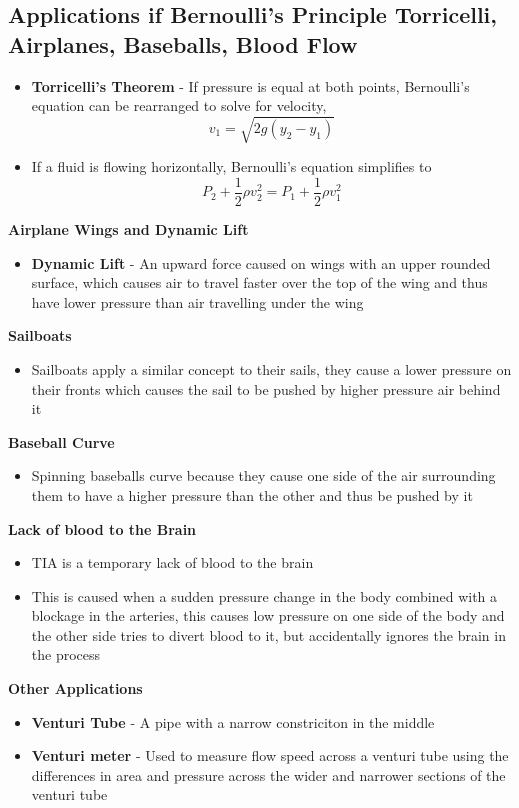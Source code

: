 \subsection{Applications if Bernoulli’s Principle Torricelli, Airplanes, Baseballs, Blood Flow}
\begin{itemize}
    \item \textbf{Torricelli's Theorem} - If pressure is equal at both points, Bernoulli's equation can be rearranged to solve for velocity, \[v_1=\sqrt{2g(y_2-y_1)}\]
    \item If a fluid is flowing horizontally, Bernoulli's equation simplifies to \[P_2+\frac{1}{2}\rho v^2_2=P_1+\frac{1}{2}\rho v^2_1\]
\end{itemize}

\textbf{Airplane Wings and Dynamic Lift}
\begin{itemize}
    \item \textbf{Dynamic Lift} - An upward force caused on wings with an upper rounded surface, which causes air to travel faster over the top of the wing and thus have lower pressure than air travelling under the wing
\end{itemize}

\textbf{Sailboats}
\begin{itemize}
    \item Sailboats apply a similar concept to their sails, they cause a lower pressure on their fronts which causes the sail to be pushed by higher pressure air behind it
\end{itemize}

\textbf{Baseball Curve}
\begin{itemize}
    \item Spinning baseballs curve because they cause one side of the air surrounding them to have a higher pressure than the other and thus be pushed by it
\end{itemize}

\textbf{Lack of blood to the Brain}
\begin{itemize}
    \item TIA is a temporary lack of blood to the brain
    \item This is caused when a sudden pressure change in the body combined with a blockage in the arteries, this causes low pressure on one side of the body and the other side tries to divert blood to it, but accidentally ignores the brain in the process
\end{itemize}

\textbf{Other Applications}
\begin{itemize}
    \item \textbf{Venturi Tube} - A pipe with a narrow constriciton in the middle
    \item \textbf{Venturi meter} - Used to measure flow speed across a venturi tube using the differences in area and pressure across the wider and narrower sections of the venturi tube
\end{itemize}

